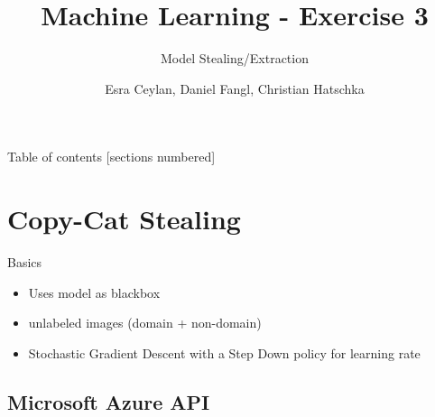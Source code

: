 \documentclass[10pt]{beamer}
\title{Machine Learning - Exercise 3}
\subtitle{Model Stealing/Extraction}
\date{}
\author{Esra Ceylan, Daniel Fangl, Christian Hatschka}
\institute{TU Wien}
\begin{document}
\maketitle
\begin{frame}{Table of contents}
  [sections numbered]
  \tableofcontents%
\end{frame}
\section[Copy-Cat Stealing]{Copy-Cat Stealing}
\begin{frame}[fragile]{Basics}
\begin{itemize}
    \item Uses model as blackbox
    \item unlabeled images (domain + non-domain)
    \item Stochastic Gradient Descent with a Step Down policy for learning rate
\end{itemize}
\end{frame}
\subsection[Microsoft Azure API]{Microsoft Azure API}
\end{document}
